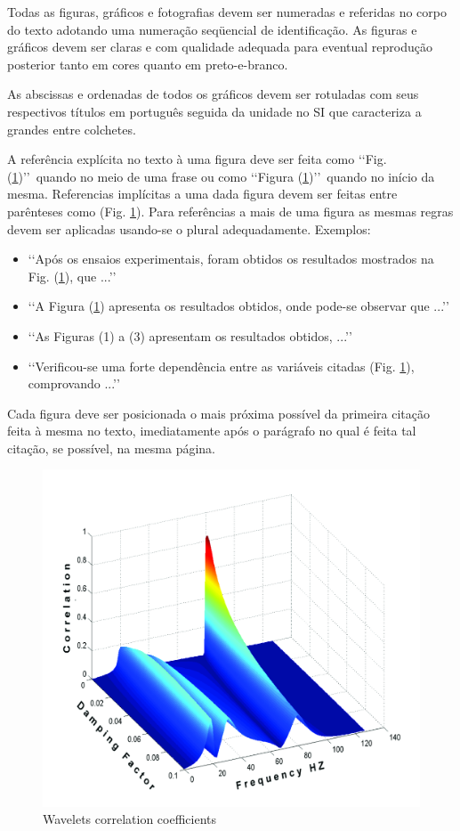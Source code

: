 Todas as figuras, gráficos e fotografias devem ser numeradas e referidas no 
corpo do texto adotando uma numeração seqüencial de identificação. As figuras e 
gráficos devem ser claras e com qualidade adequada para eventual reprodução 
posterior tanto em cores quanto em preto-e-branco.

As abscissas e ordenadas de todos os gráficos devem ser rotuladas com seus 
respectivos títulos em português seguida da unidade no SI que caracteriza a 
grandes entre colchetes. 

A referência explícita no texto à uma figura deve ser feita como 
\lq\lq Fig. (\ref{fig01})\rq\rq\ quando no meio de uma frase ou como 
\lq\lq Figura (\ref{fig01})\rq\rq\ quando no início da mesma. Referencias 
implícitas a uma dada figura devem ser feitas entre parênteses como 
(Fig. \ref{fig01}). Para referências a mais de uma figura as mesmas regras 
devem ser aplicadas usando-se o plural adequadamente. Exemplos:

\begin{itemize}
	\item \lq\lq Após os ensaios experimentais, foram obtidos os resultados 
	mostrados na Fig. (\ref{fig01}), que ...\rq\rq
	\item \lq\lq A Figura (\ref{fig01}) apresenta os resultados obtidos, onde 
	pode-se observar que ...\rq\rq
	\item \lq\lq As Figuras (1) a (3) apresentam os resultados obtidos, 
	...\rq\rq
	\item \lq\lq Verificou-se uma forte dependência entre as variáveis citadas 
	(Fig. \ref{fig01}), comprovando ...\rq\rq
\end{itemize}

Cada figura deve ser posicionada o mais próxima possível da primeira citação 
feita à mesma no texto, imediatamente após o parágrafo no qual é feita tal 
citação, se possível, na mesma página.
\begin{figure}[h]
	\centering
	\label{fig01}
		\includegraphics[keepaspectratio=true,scale=0.3]{figuras/fig01.jpg}
	\caption{Wavelets correlation coefficients}
\end{figure}

